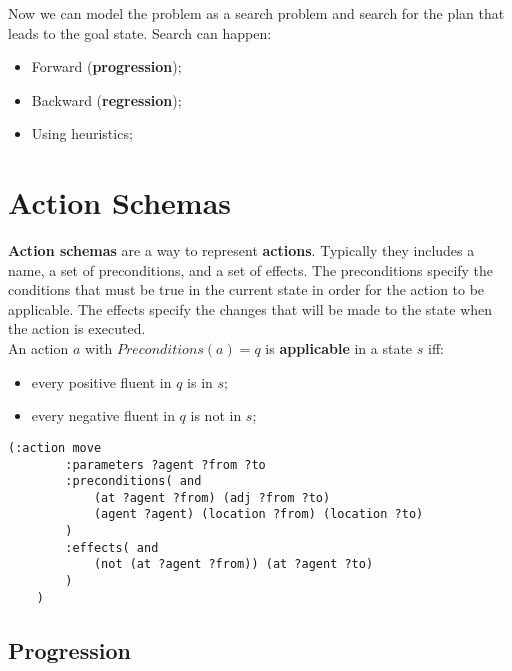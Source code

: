 \documentclass{article}
\begin{document}
Now we can model the problem as a search problem and search for the plan that leads to the goal state. Search can happen:

\begin{center}
    \begin{itemize}
        \item Forward (\textbf{progression});
        \item Backward (\textbf{regression});
        \item Using heuristics;
    \end{itemize}
\end{center}

\newpage

\section{Action Schemas}

\textbf{Action schemas} are a way to represent \textbf{actions}. Typically they includes a name, a set of preconditions, and a set of effects. The preconditions specify the conditions that must be true in the current state in order for the action to be applicable. The effects specify the changes that will be made to the state when the action is executed. \\

An action $a$ with $Preconditions(a) = q$ is \textbf{applicable} in a state $s$ iff:

\begin{itemize}
    \item every positive fluent in $q$ is in $s$;
    \item every negative fluent in $q$ is not in $s$;
\end{itemize}

\vspace{2cm}

\begin{lstlisting}[language=PDDL]
    (:action move
        :parameters ?agent ?from ?to
        :preconditions( and
            (at ?agent ?from) (adj ?from ?to)
            (agent ?agent) (location ?from) (location ?to)
        )
        :effects( and
            (not (at ?agent ?from)) (at ?agent ?to)
        )
    )
\end{lstlisting}

\newpage

\subsection{Progression}
\end{document}
